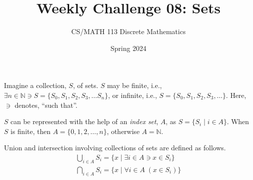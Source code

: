 \documentclass[a4paper]{exam}
\title{Weekly Challenge 08: Sets}
\author{CS/MATH 113 Discrete Mathematics}
\date{Spring 2024}
\newcommand\N{\ensuremath{\mathbb{N}}}
\begin{document}
\maketitle

\begin{questions}

  Imagine a collection, $S$, of sets. $S$ may be finite, i.e., $\exists n\in \N\ni S = \{S_0,S_1,S_2, S_3, \ldots S_n\}$, or infinite, i.e., $S = \{S_0,S_1,S_2, S_3, \ldots \}$. Here, $\ni$ denotes, ``such that''.

  $S$ can be represented with the help of an \textit{index set}, $A$, as $S = \{S_i\mid i \in A\}$. When $S$ is finite, then $A = \{0,1,2,\ldots,n \}$, otherwise $A=\N$.

  Union and intersection involving collections of sets are defined as follows.
  \begin{align*}
    \bigcup_{i \in A}S_i = \{x\mid \exists i \in A \ni x \in S_i\}\\
    \bigcap_{i \in A}S_i = \{x\mid\forall i \in A\; (x \in S_i)\}
  \end{align*}

\end{questions}
\end{document}
